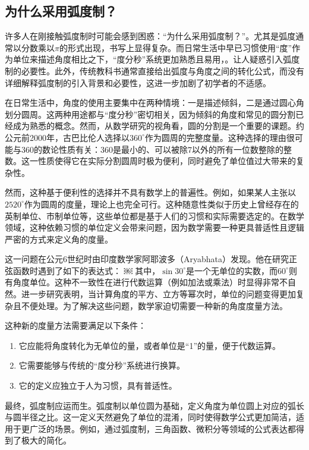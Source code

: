 \subsection{为什么采用弧度制？}

许多人在刚接触弧度制时可能会感到困惑：“为什么采用弧度制？”。尤其是弧度通常以分数乘以$\pi$的形式出现，书写上显得复杂。而日常生活中早已习惯使用“度”作为单位来描述角度相比之下，“度分秒”系统更加熟悉且易用，。让人疑惑引入弧度制的必要性。此外，传统教科书通常直接给出弧度与角度之间的转化公式，而没有详细解释弧度制的引入背景和必要性，这进一步加剧了初学者的不适感。

在日常生活中，角度的使用主要集中在两种情境：一是描述倾斜，二是通过圆心角划分圆周。这两种用途都与“度分秒”密切相关，因为倾斜的角度和常见的圆分割已经成为熟悉的概念。然而，从数学研究的视角看，圆的分割是一个重要的课题。约公元前2000年，古巴比伦人选择以$360^\circ$作为圆周的完整度量。这种选择的理由很可能与360的数论性质有关：360是最小的、可以被除7以外的所有一位数整除的整数。这一性质使得它在实际分割圆周时极为便利，同时避免了单位值过大带来的复杂性。

然而，这种基于便利性的选择并不具有数学上的普遍性。例如，如果某人主张以$2520^\circ$作为圆周的度量，理论上也完全可行。这种随意性类似于历史上曾经存在的英制单位、市制单位等，这些单位都是基于人们的习惯和实际需要选定的。在数学领域，这种依赖习惯的单位定义会带来问题，因为数学需要一种更具普适性且逻辑严密的方式来定义角的度量。

这一问题在公元6世纪时由印度数学家阿耶波多（Aryabhata）发现。他在研究正弦函数时遇到了如下的表达式：
￼
其中，$\sin 30^\circ$是一个无单位的实数，而$60^\circ$则有角度单位。这种不一致性在进行代数运算（例如加法或乘法）时显得非常不自然。进一步研究表明，当计算角度的平方、立方等幂次时，单位的问题变得更加复杂且不便处理。为了解决这些问题，数学家迫切需要一种新的角度度量方法。

这种新的度量方法需要满足以下条件：
\begin{enumerate}
\item 它应能将角度转化为无单位的量，或者单位是“1”的量，便于代数运算。
\item 它需要能够与传统的“度分秒”系统进行换算。
\item 它的定义应独立于人为习惯，具有普适性。
\end{enumerate}

最终，弧度制应运而生。弧度制以单位圆为基础，定义角度为单位圆上对应的弧长与圆半径之比。这一定义天然避免了单位的混淆，同时使得数学公式更加简洁，适用于更广泛的场景。例如，通过弧度制，三角函数、微积分等领域的公式表达都得到了极大的简化。


